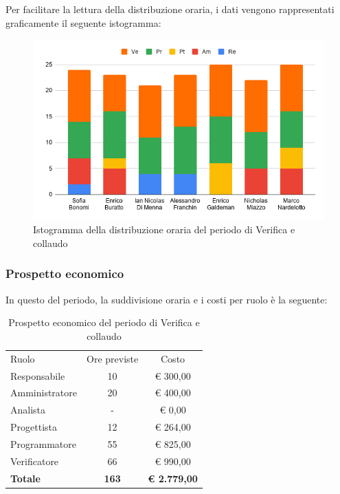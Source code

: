 \documentclass[../piano-di-progetto.tex]{subfiles}
\begin{document}
  Per facilitare la lettura della distribuzione oraria, i dati vengono rappresentati graficamente il seguente istogramma:
  \begin{figure}[H]
    \centering
    \includegraphics[width=12cm]{img/ore-verifica.png}
    \caption{Istogramma della distribuzione oraria del periodo di Verifica e collaudo}
    \label{fig:ore-componente-verifica}
  \end{figure}

  \subsubsection{Prospetto economico}
  In questo del periodo, la suddivisione oraria e i costi per ruolo è la seguente:

  \begin{table}[H]
    \centering
    \begin{tabular}{lcc}
      Ruolo           & Ore previste & Costo               \\
      Responsabile    & 10           & € 300,00            \\
      Amministratore  & 20           & € 400,00            \\
      Analista        & -            & € 0,00              \\
      Progettista     & 12           & € 264,00            \\
      Programmatore   & 55           & € 825,00            \\
      Verificatore    & 66           & € 990,00            \\
      \textbf{Totale} & \textbf{163} & \textbf{€ 2.779,00}
    \end{tabular}
    \caption{Prospetto economico del periodo di Verifica e collaudo}
  \end{table}
\end{document}
